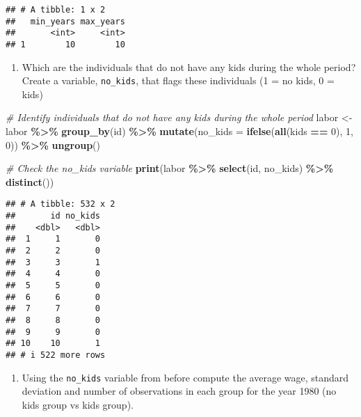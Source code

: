\documentclass[
]{article}
\newenvironment{Shaded}{\begin{snugshade}}{\end{snugshade}}
\newcommand{\AttributeTok}[1]{\textcolor[rgb]{0.13,0.29,0.53}{#1}}
\newcommand{\CommentTok}[1]{\textcolor[rgb]{0.56,0.35,0.01}{\textit{#1}}}
\newcommand{\DecValTok}[1]{\textcolor[rgb]{0.00,0.00,0.81}{#1}}
\newcommand{\FunctionTok}[1]{\textcolor[rgb]{0.13,0.29,0.53}{\textbf{#1}}}
\newcommand{\NormalTok}[1]{#1}
\newcommand{\OtherTok}[1]{\textcolor[rgb]{0.56,0.35,0.01}{#1}}
\newcommand{\SpecialCharTok}[1]{\textcolor[rgb]{0.81,0.36,0.00}{\textbf{#1}}}
\providecommand{\tightlist}{%
  \setlength{\itemsep}{0pt}\setlength{\parskip}{0pt}}
\begin{document}
\begin{verbatim}
## # A tibble: 1 x 2
##   min_years max_years
##       <int>     <int>
## 1        10        10
\end{verbatim}

\begin{enumerate}
\def\labelenumi{\alph{enumi}.}
\setcounter{enumi}{3}
\tightlist
\item
  Which are the individuals that do not have any kids during the whole
  period? Create a variable, \texttt{no\_kids}, that flags these
  individuals (1 = no kids, 0 = kids)
\end{enumerate}

\begin{Shaded}
\begin{Highlighting}[]
\CommentTok{\# Identify individuals that do not have any kids during the whole period}
\NormalTok{labor }\OtherTok{\textless{}{-}}\NormalTok{ labor }\SpecialCharTok{\%\textgreater{}\%}
  \FunctionTok{group\_by}\NormalTok{(id) }\SpecialCharTok{\%\textgreater{}\%}
  \FunctionTok{mutate}\NormalTok{(}\AttributeTok{no\_kids =} \FunctionTok{ifelse}\NormalTok{(}\FunctionTok{all}\NormalTok{(kids }\SpecialCharTok{==} \DecValTok{0}\NormalTok{), }\DecValTok{1}\NormalTok{, }\DecValTok{0}\NormalTok{)) }\SpecialCharTok{\%\textgreater{}\%}
  \FunctionTok{ungroup}\NormalTok{()}

\CommentTok{\# Check the \textasciigrave{}no\_kids\textasciigrave{} variable}
\FunctionTok{print}\NormalTok{(labor }\SpecialCharTok{\%\textgreater{}\%} \FunctionTok{select}\NormalTok{(id, no\_kids) }\SpecialCharTok{\%\textgreater{}\%} \FunctionTok{distinct}\NormalTok{())}
\end{Highlighting}
\end{Shaded}

\begin{verbatim}
## # A tibble: 532 x 2
##       id no_kids
##    <dbl>   <dbl>
##  1     1       0
##  2     2       0
##  3     3       1
##  4     4       0
##  5     5       0
##  6     6       0
##  7     7       0
##  8     8       0
##  9     9       0
## 10    10       1
## # i 522 more rows
\end{verbatim}

\begin{enumerate}
\def\labelenumi{\alph{enumi}.}
\setcounter{enumi}{4}
\tightlist
\item
  Using the \texttt{no\_kids} variable from before compute the average
  wage, standard deviation and number of observations in each group for
  the year 1980 (no kids group vs kids group).
\end{enumerate}
\end{document}
